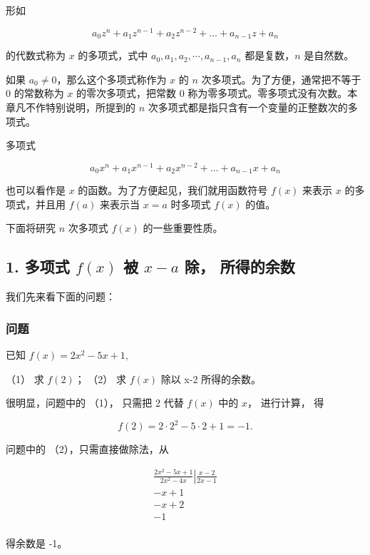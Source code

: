 形如

\[
a _ {0} z ^ {n} + a _ {1} z ^ {n - 1} + a _ {2} z ^ {n - 2} + \dots + a _ {n - 1} z + a _ {n}
\]

的代数式称为 \(x\) 的多项式，式中
\(a_0, a_1, a_2, \cdots, a_{n-1}, a_n\) 都是复数，\(n\) 是自然数。

如果 \(a_0 \neq 0\)，那么这个多项式称作为 \(x\) 的 \(n\)
次多项式。为了方便，通常把不等于 0 的常数称为 \(x\) 的零次多项式，把常数
0 称为零多项式。零多项式没有次数。本章凡不作特别说明，所提到的 \(n\)
次多项式都是指只含有一个变量的正整数次的多项式。

多项式

\[
a _ {0} x ^ {n} + a _ {1} x ^ {n - 1} + a _ {2} x ^ {n - 2} + \dots + a _ {n - 1} x + a _ {n}
\]

也可以看作是 \(x\) 的函数。为了方便起见，我们就用函数符号 \(f(x)\)
来表示 \(x\) 的多项式，并且用 \(f(a)\) 来表示当 \(x = a\) 时多项式
\(f(x)\) 的值。

下面将研究 \(n\) 次多项式 \(f(x)\) 的一些重要性质。

\subsection{\texorpdfstring{1. 多项式 \(f(x)\) 被 \(x - a\) 除， 所得的余数}{1. 多项式 f(x) 被 x - a 除， 所得的余数}}

我们先来看下面的问题：

\subsubsection{问题}

已知 \(f(x) = 2x^{2} - 5x + 1,\)

（1） 求 \(f(2)\)； （2） 求 \(f(x)\) 除以 x-2 所得的余数。

很明显，问题中的 （1）， 只需把 2 代替 \(f(x)\) 中的 \(x\)， 进行计算，
得

\[
f (2) = 2 \cdot 2 ^ {2} - 5 \cdot 2 + 1 = - 1.
\]

问题中的 （2），只需直接做除法，从

\[
\begin{array}{l} \frac {2 x ^ {2} - 5 x + 1}{2 x ^ {2} - 4 x} \left| \frac {x - 2}{2 x - 1} \right. \\ - x + 1 \\ - x + 2 \\ - 1 \\ \end{array}
\]

得余数是 -1。

